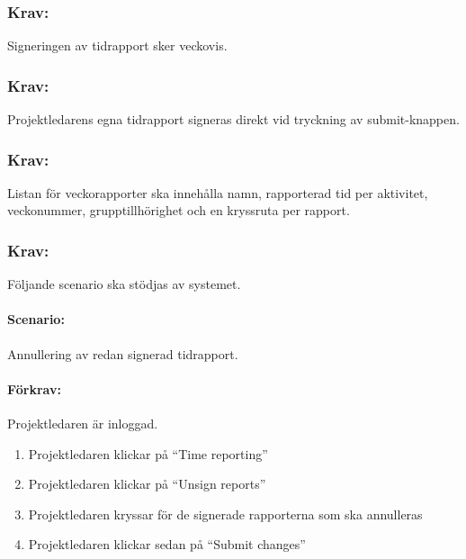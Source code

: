 \documentclass[paper=a4, fontsize=11pt,twoside]{article}
\begin{document}
\paragraph{}

\subsubsection{Krav:}
Signeringen av tidrapport sker veckovis.

\paragraph{}

\subsubsection{Krav:}
Projektledarens egna tidrapport signeras direkt vid tryckning av submit-knappen.

\paragraph{}

\subsubsection{Krav:}
Listan för veckorapporter ska innehålla namn, rapporterad tid per aktivitet, veckonummer, grupptillhörighet och en kryssruta per rapport.

\paragraph{}

\subsubsection{Krav:}
Följande scenario ska stödjas av systemet.
\paragraph{Scenario:} Annullering av redan signerad tidrapport.
\paragraph{Förkrav:} Projektledaren är inloggad.
\begin{enumerate}
\item Projektledaren klickar på “Time reporting”
\item Projektledaren klickar på “Unsign reports”
\item Projektledaren kryssar för de signerade rapporterna som ska annulleras
\item Projektledaren klickar sedan på “Submit changes”
\end{enumerate}
\end{document}
